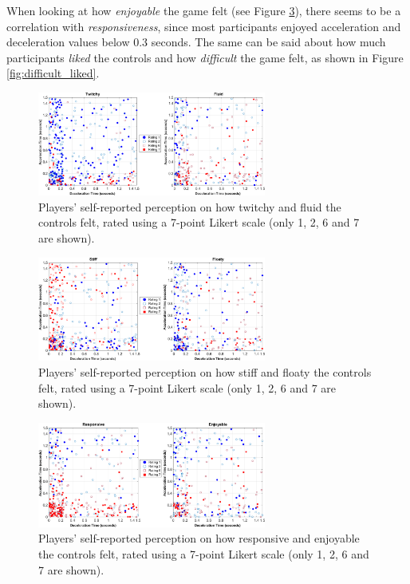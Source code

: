 When looking at how \textit{enjoyable} the game felt (see Figure \ref{fig:responsive_enjoyable}), there seems to be a correlation with \textit{responsiveness}, since most participants enjoyed acceleration and deceleration values below 0.3 seconds. The same can be said about how much participants \textit{liked} the controls and how \textit{difficult} the game felt, as shown in Figure \ref{fig:difficult_liked}.

\begin{figure}[htbp]
\centering
\includegraphics[width=0.67\textwidth]{Pics/Classes/twitchy_fluid}
\caption{Players' self-reported perception on how twitchy and fluid the controls felt, rated using a 7-point Likert scale (only 1, 2, 6 and 7 are shown).}
\label{fig:twitchyFluid}
\end{figure}

\begin{figure}[htbp]
\centering
\includegraphics[width=0.67\textwidth]{Pics/Classes/Stiff_floaty}
\caption{Players' self-reported perception on how stiff and floaty the controls felt, rated using a 7-point Likert scale (only 1, 2, 6 and 7 are shown).}
\label{fig:stiff_floaty}
\end{figure}

\begin{figure}[htbp]
\centering
\includegraphics[width=0.67\textwidth]{Pics/Classes/Responsive_enjoyable}
\caption{Players' self-reported perception on how responsive and enjoyable the controls felt, rated using a 7-point Likert scale (only 1, 2, 6 and 7 are shown).}
\label{fig:responsive_enjoyable}
\end{figure}

